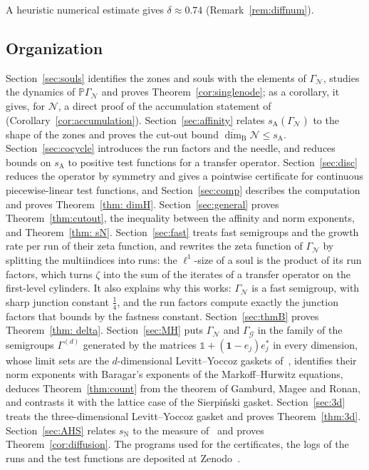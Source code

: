 \documentclass[11pt]{amsart}
\newcommand{\id}{\mathds{1}}
\theoremstyle{definition}
\theoremstyle{remark}
\newcommand{\one}{\mathbf 1}
\newcommand{\cN}{\mathcal N}
\newcommand{\GN}{\Gamma_{\mathcal N}}
\newcommand{\PGN}{{\mathbb P}\Gamma_{\mathcal N}}
\newcommand{\GG}{\Gamma_{\mathcal G}}
\newcommand{\udimB}{\overline{\dim}_{\mathrm B}}
\newcommand{\sN}{s_{\mathrm N}}
\newcommand{\sA}{s_{\mathrm A}}
\begin{document}
A heuristic numerical estimate gives $\delta\approx0.74$ (Remark~\ref{rem:diffnum}).

\subsection*{Organization}
Section~\ref{sec:souls} identifies the zones and souls with the elements of $\GN$, studies the dynamics of $\PGN$ and proves Theorem~\ref{cor:singlenode}; as a corollary, it gives, for $\cN$, a direct proof of the accumulation statement of~\cite{DL03,DL05} (Corollary~\ref{cor:accumulation}).
Section~\ref{sec:affinity} relates $\sA(\GN)$ to the shape of the zones and proves the cut-out bound $\udimB\cN\le\sA$.
Section~\ref{sec:cocycle} introduces the run factors and the needle, and reduces bounds on $\sA$ to positive test functions for a transfer operator.
Section~\ref{sec:disc} reduces the operator by symmetry and gives a pointwise certificate for continuous piecewise-linear test functions, and Section~\ref{sec:comp} describes the computation and proves Theorem~\ref{thm: dimH}.
Section~\ref{sec:general} proves Theorem~\ref{thm:cutout}, the inequality between the affinity and norm exponents, and Theorem~\ref{thm: sN}.
Section~\ref{sec:fast} treats fast semigroups and the growth rate per run of their zeta function, and rewrites the zeta function of $\GN$ by splitting the multiindices into runs: the $\ell^1$-size of a soul is the product of its run factors, which turns $\zeta$ into the sum of the iterates of a transfer operator on the first-level cylinders. It also explains why this works: $\GN$ is a fast semigroup, with sharp junction constant $\frac14$, and the run factors compute exactly the junction factors that \cite[Thm.~1]{DL15JGA} bounds by the fastness constant.
Section~\ref{sec:thmB} proves Theorem~\ref{thm: delta}.
Section~\ref{sec:MH} puts $\GN$ and $\GG$ in the family of the semigroups $\Gamma^{(d)}$ generated by the matrices $\id+(\one-e_j)e_j^*$ in every dimension, whose limit sets are the $d$-dimensional Levitt--Yoccoz gaskets of~\cite{DL08,DL15JGA}, identifies their norm exponents with Baragar's exponents of the Markoff--Hurwitz equations, deduces Theorem~\ref{thm:count} from the theorem of Gamburd, Magee and Ronan, and contrasts it with the lattice case of the Sierpi\'nski gasket.
Section~\ref{sec:3d} treats the three-dimensional Levitt--Yoccoz gasket and proves Theorem~\ref{thm:3d}. Section~\ref{sec:AHS} relates $\sN$ to the measure of~\cite{AHSinv} and proves Theorem~\ref{cor:diffusion}.
The programs used for the certificates, the logs of the runs and the test functions are deposited at Zenodo~\cite{DLdata}.
\end{document}

